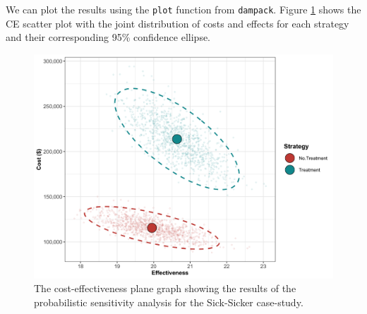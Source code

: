 \documentclass[]{book}
\newenvironment{Shaded}{\begin{snugshade}}{\end{snugshade}}
\newcommand{\KeywordTok}[1]{\textcolor[rgb]{0.13,0.29,0.53}{\textbf{#1}}}
\newcommand{\DataTypeTok}[1]{\textcolor[rgb]{0.13,0.29,0.53}{#1}}
\newcommand{\DecValTok}[1]{\textcolor[rgb]{0.00,0.00,0.81}{#1}}
\newcommand{\CharTok}[1]{\textcolor[rgb]{0.31,0.60,0.02}{#1}}
\newcommand{\StringTok}[1]{\textcolor[rgb]{0.31,0.60,0.02}{#1}}
\newcommand{\CommentTok}[1]{\textcolor[rgb]{0.56,0.35,0.01}{\textit{#1}}}
\newcommand{\ControlFlowTok}[1]{\textcolor[rgb]{0.13,0.29,0.53}{\textbf{#1}}}
\newcommand{\OperatorTok}[1]{\textcolor[rgb]{0.81,0.36,0.00}{\textbf{#1}}}
\newcommand{\NormalTok}[1]{#1}
\begin{document}
\begin{Shaded}
\end{Shaded}

We can plot the results using the \texttt{plot} function from
\texttt{dampack}. Figure \ref{fig:05b-CEAplane} shows the CE scatter
plot with the joint distribution of costs and effects for each strategy
and their corresponding 95\% confidence ellipse.

\begin{figure}

{\centering \includegraphics[width=1\linewidth]{../figs/05b_cea_plane_scatter} 

}

\caption{The cost-effectiveness plane graph showing the results of the probabilistic sensitivity analysis for the Sick-Sicker case-study.}\label{fig:05b-CEAplane}
\end{figure}
\end{document}

